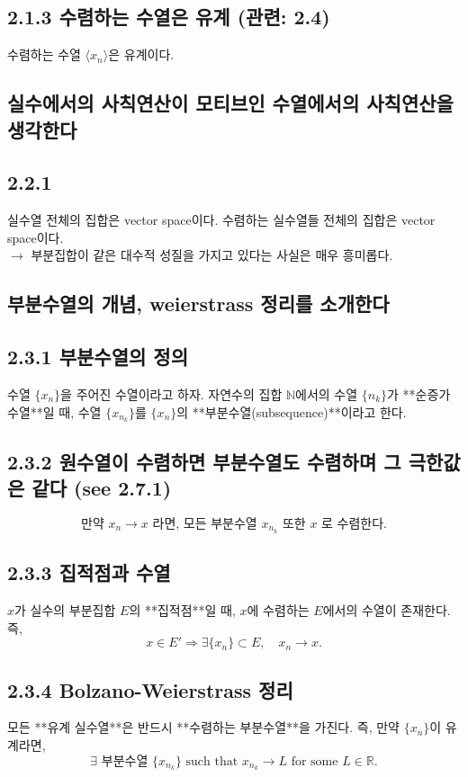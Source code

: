 \documentclass{article}
\begin{document}
\subsection*{\textmd{2.1.3 수렴하는 수열은 유계 (관련: 2.4)}}
수렴하는 수열 \( \langle x_n \rangle \)은 유계이다.

\subsection{실수에서의 사칙연산이 모티브인 수열에서의 사칙연산을 생각한다}
\subsection*{\textmd{2.2.1}}
실수열 전체의 집합은 vector space이다.
수렴하는 실수열들 전체의 집합은 vector space이다.
\\
$\to$ 부분집합이 같은 대수적 성질을 가지고 있다는 사실은 매우 흥미롭다.

\subsection{부분수열의 개념, weierstrass 정리를 소개한다}

\subsection*{\textmd{2.3.1 부분수열의 정의}}
수열 \( \{ x_n \} \)을 주어진 수열이라고 하자. 자연수의 집합 \( \mathbb{N} \)에서의 수열 \( \{ n_k \} \)가 **순증가 수열**일 때, 수열 \( \{ x_{n_k} \} \)를 \( \{ x_n \} \)의 **부분수열(subsequence)**이라고 한다.

\subsection*{\textmd{2.3.2 원수열이 수렴하면 부분수열도 수렴하며 그 극한값은 같다 (see 2.7.1)}}
\[
\text{만약 } x_n \to x \text{ 라면, 모든 부분수열 } x_{n_k} \text{ 또한 } x \text{ 로 수렴한다.}
\]

\subsection*{\textmd{2.3.3 집적점과 수열}}
\( x \)가 실수의 부분집합 \( E \)의 **집적점**일 때, \( x \)에 수렴하는 \( E \)에서의 수열이 존재한다. 즉,
\[
x \in E'  \Rightarrow \exists \{ x_n \} \subset E, \quad x_n \to x.
\]

\subsection*{\textmd{2.3.4 Bolzano-Weierstrass 정리}}
모든 **유계 실수열**은 반드시 **수렴하는 부분수열**을 가진다. 즉, 만약 \( \{ x_n \} \)이 유계라면,
\[
\exists \text{ 부분수열 } \{ x_{n_k} \} \text{ such that } x_{n_k} \to L \text{ for some } L \in \mathbb{R}.
\]
\end{document}
